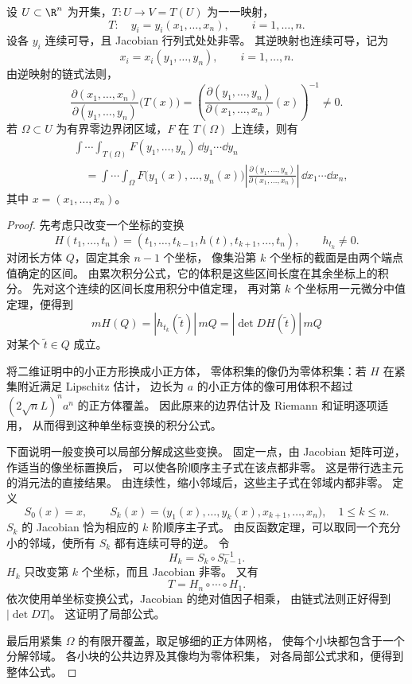 \begin{theorem}[重积分的变量代换]
设 $U\subset\R^n$ 为开集，$T:U\to V=T(U)$ 为一一映射，
\[
T:\quad y_i=y_i(x_1,\ldots,x_n),\qquad i=1,\ldots,n.
\]
设各 $y_i$ 连续可导，且 Jacobian 行列式处处非零。
其逆映射也连续可导，记为
\[
x_i=x_i(y_1,\ldots,y_n),\qquad i=1,\ldots,n.
\]
由逆映射的链式法则，
\[
\frac{\partial(x_1,\ldots,x_n)}{\partial(y_1,\ldots,y_n)}\bigl(T(x)\bigr)
=\left(\frac{\partial(y_1,\ldots,y_n)}{\partial(x_1,\ldots,x_n)}(x)\right)^{-1}
\ne0.
\]
若 $\Omega\subset U$ 为有界零边界闭区域，$F$ 在 $T(\Omega)$ 上连续，则有
\[
\begin{aligned}
&\int\cdots\int_{T(\Omega)}F(y_1,\ldots,y_n)\,\dd y_1\cdots\dd y_n\\
&\quad=\int\cdots\int_\Omega
 F\bigl(y_1(x),\ldots,y_n(x)\bigr)
 \left|\frac{\partial(y_1,\ldots,y_n)}{\partial(x_1,\ldots,x_n)}\right|
 \,\dd x_1\cdots\dd x_n,
\end{aligned}
\]
其中 $x=(x_1,\ldots,x_n)$。
\end{theorem}
\begin{proof}
先考虑只改变一个坐标的变换
\[
H(t_1,\ldots,t_n)
=(t_1,\ldots,t_{k-1},h(t),t_{k+1},\ldots,t_n),
\qquad h_{t_k}\ne0.
\]
对闭长方体 $Q$，固定其余 $n-1$ 个坐标，
像集沿第 $k$ 个坐标的截面是由两个端点值确定的区间。
由累次积分公式，它的体积是这些区间长度在其余坐标上的积分。
先对这个连续的区间长度用积分中值定理，
再对第 $k$ 个坐标用一元微分中值定理，便得到
\[
mH(Q)=|h_{t_k}(\widetilde t)|\,mQ
=|\det DH(\widetilde t)|\,mQ
\]
对某个 $\widetilde t\in Q$ 成立。

将二维证明中的小正方形换成小正方体，
零体积集的像仍为零体积集：若 $H$ 在紧集附近满足 Lipschitz 估计，
边长为 $a$ 的小正方体的像可用体积不超过
$(2\sqrt nL)^na^n$ 的正方体覆盖。
因此原来的边界估计及 Riemann 和证明逐项适用，
从而得到这种单坐标变换的积分公式。

下面说明一般变换可以局部分解成这些变换。
固定一点，由 Jacobian 矩阵可逆，作适当的像坐标置换后，
可以使各阶顺序主子式在该点都非零。
这是带行选主元的消元法的直接结果。
由连续性，缩小邻域后，这些主子式在邻域内都非零。
定义
\[
S_0(x)=x,\qquad
S_k(x)=\bigl(y_1(x),\ldots,y_k(x),x_{k+1},\ldots,x_n\bigr),
\quad 1\le k\le n.
\]
$S_k$ 的 Jacobian 恰为相应的 $k$ 阶顺序主子式。
由反函数定理，可以取同一个充分小的邻域，使所有 $S_k$ 都有连续可导的逆。
令
\[
H_k=S_k\circ S_{k-1}^{-1}.
\]
$H_k$ 只改变第 $k$ 个坐标，而且 Jacobian 非零。
又有
\[
T=H_n\circ\cdots\circ H_1.
\]
依次使用单坐标变换公式，Jacobian 的绝对值因子相乘，
由链式法则正好得到 $|\det DT|$。
这证明了局部公式。

最后用紧集 $\Omega$ 的有限开覆盖，取足够细的正方体网格，
使每个小块都包含于一个分解邻域。
各小块的公共边界及其像均为零体积集，
对各局部公式求和，便得到整体公式。
\end{proof}

